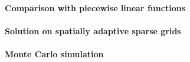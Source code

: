 \dummytext[6]{}

\paragraph{Comparison with piecewise linear functions}

\dummytext[6]{}

\paragraph{Solution on spatially adaptive sparse grids}

\dummytext[6]{}

\paragraph{Monte Carlo simulation}


\dummytext[6]{}
